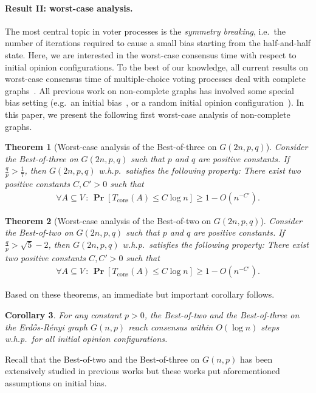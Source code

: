 \documentclass[letterpaper,11pt]{article}
\newtheorem{theorem}{Theorem}[section]
\newtheorem{corollary}[theorem]{Corollary}
\newcommand{\Tcons}{T_{\mathrm{cons}}}
\renewcommand\Pr{\mathop{\mathbf{Pr}}}
\begin{document}
%
\paragraph*{Result I\hspace{-.1em}I: worst-case analysis.}
The most central topic in voter processes is the \emph{symmetry breaking}, i.e.~the number of iterations required to cause a small bias starting from the half-and-half state.
Here, we are interested in the worst-case consensus time with respect to initial opinion configurations.
To the best of our knowledge, all current results on worst-case consensus time of multiple-choice voting processes deal with complete graphs~\cite{DGMSS11,BCNPST17, BCEKMN17, GL18}.
All previous work on non-complete graphs has involved some special bias setting (e.g.~an initial bias~\cite{CER14,CERRS15,CRRS17}, or a random initial opinion configuration~\cite{AD15,CNS19,KR19}).
In this paper, we present the following first worst-case analysis of non-complete graphs.
%
\begin{theorem}[Worst-case analysis of the Best-of-three on $G(2n,p,q)$] \label{thm:worst_case_3M}
Consider the Best-of-three on  $G(2n,p,q)$ such that $p$ and $q$ are positive constants.
If $\frac{q}{p}>\frac{1}{7}$, then $G(2n,p,q)$ w.h.p.~satisfies the following property:
%
There exist two positive constants $C,C'>0$ such that %
\begin{align*}
\forall A\subseteq V\, :\, \Pr\left[\Tcons(A)\leq C\log n \right] \geq 1-O\left(n^{-C'}\right).
\end{align*}
\end{theorem}
%
\begin{theorem}[Worst-case analysis of the Best-of-two on $G(2n,p,q)$] \label{thm:worst_case_2C}
Consider the Best-of-two on $G(2n,p,q)$ such that $p$ and $q$ are positive constants.
If $\frac{q}{p}>\sqrt{5}-2$, then $G(2n,p,q)$ w.h.p.~satisfies the following property:
%
There exist two positive constants $C,C'>0$ such that %
\begin{align*}
\forall A\subseteq V\, :\, \Pr\left[\Tcons(A)\leq C\log n \right] \geq 1-O\left(n^{-C'}\right).
\end{align*}
\end{theorem}

Based on these theorems, an immediate but important corollary follows.
\begin{corollary}
For any constant $p>0$, the Best-of-two and the Best-of-three on the Erd\H{o}s-R\'enyi graph $G(n,p)$ reach  consensus within $O(\log n)$ steps w.h.p.~for all initial opinion configurations.
\end{corollary}
Recall that the Best-of-two and the Best-of-three on $G(n,p)$ has been extensively studied in previous works but these works put aforementioned assumptions on initial bias.
%
\end{document}
